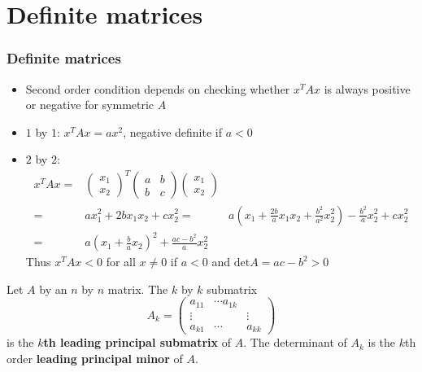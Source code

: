 \documentclass[compress]{beamer}
\renewcommand{\det}{\mathrm{det}}
\begin{document}
\section{Definite matrices}

\begin{frame}
  \frametitle{Definite matrices}
  \begin{itemize}
  \item Second order condition depends on checking whether $x^T A x$
    is always positive or negative for symmetric $A$
  \item $1$ by $1$: $x^T A x = ax^2$, negative definite if $a<0$
  \item $2$ by $2$:
    \begin{align*}
      x^T A x = & \begin{pmatrix} x_1 \\ x_2 \end{pmatrix}^T 
      \begin{pmatrix}
        a & b \\ b & c 
      \end{pmatrix}
      \begin{pmatrix} x_1 \\ x_2 \end{pmatrix}
      \\ 
      = & a x_1^2 + 2b x_1 x_2 + c x_2^2
      = & a\left(x_1 + \frac{2b}{a} x_1 x_2 + \frac{b^2}{a^2}
        x_2^2\right) - \frac{b^2}{a} x_2^2 + c x_2^2 \\
      = &a\left(x_1 + \frac{b}{a} x_2\right)^2 + \frac{ac-b^2}{a} x_2^2 
    \end{align*}
    Thus $x^T A x < 0$ for all $x \neq 0$ if $a < 0$ and
    $\det A = ac - b^2 > 0$
  \end{itemize}
\end{frame}

\begin{frame}
  \begin{definition}
    Let $A$ by an $n$ by $n$ matrix. The $k$ by $k$ submatrix 
    \[ A_k = \begin{pmatrix} a_{11} & \cdots a_{1k} \\
      \vdots & & \vdots \\
      a_{k1} & \cdots & a_{kk} \end{pmatrix} \]
    is the \textbf{$k$th leading principal submatrix} of $A$. The
    determinant of $A_k$ is the $k$th order \textbf{leading principal
      minor} of $A$.
  \end{definition}
\end{frame}  
\end{document}

